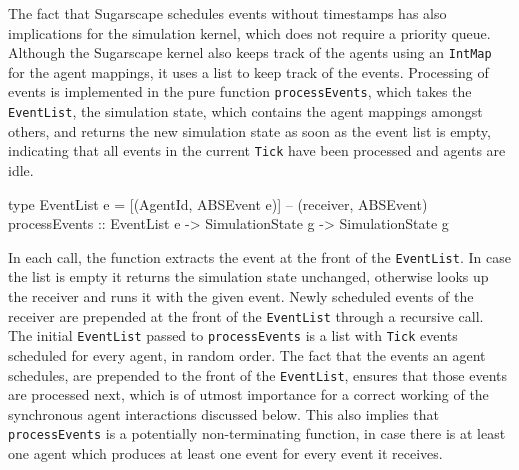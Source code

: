 The fact that Sugarscape schedules events without timestamps has also implications for the simulation kernel, which does not require a priority queue. Although the Sugarscape kernel also keeps track of the agents using an \texttt{IntMap} for the agent mappings, it uses a list to keep track of the events. Processing of events is implemented in the pure function \texttt{processEvents}, which takes the \texttt{EventList}, the simulation state, which contains the agent mappings amongst others, and returns the new simulation state as soon as the event list is empty, indicating that all events in the current \texttt{Tick} have been processed and agents are idle.

\begin{HaskellCode}
type EventList e = [(AgentId, ABSEvent e)] -- (receiver, ABSEvent)
processEvents :: EventList e -> SimulationState g -> SimulationState g
\end{HaskellCode}

In each call, the function extracts the event at the front of the \texttt{EventList}. In case the list is empty it returns the simulation state unchanged, otherwise looks up the receiver and runs it with the given event. Newly scheduled events of the receiver are prepended at the front of the \texttt{EventList} through a recursive call. The initial \texttt{EventList} passed to \texttt{processEvents} is a list with \texttt{Tick} events scheduled for every agent, in random order. The fact that the events an agent schedules, are prepended to the front of the \texttt{EventList}, ensures that those events are processed next, which is of utmost importance for a correct working of the synchronous agent interactions discussed below. This also implies that \texttt{processEvents} is a potentially non-terminating function, in case there is at least one agent which produces at least one event for every event it receives.